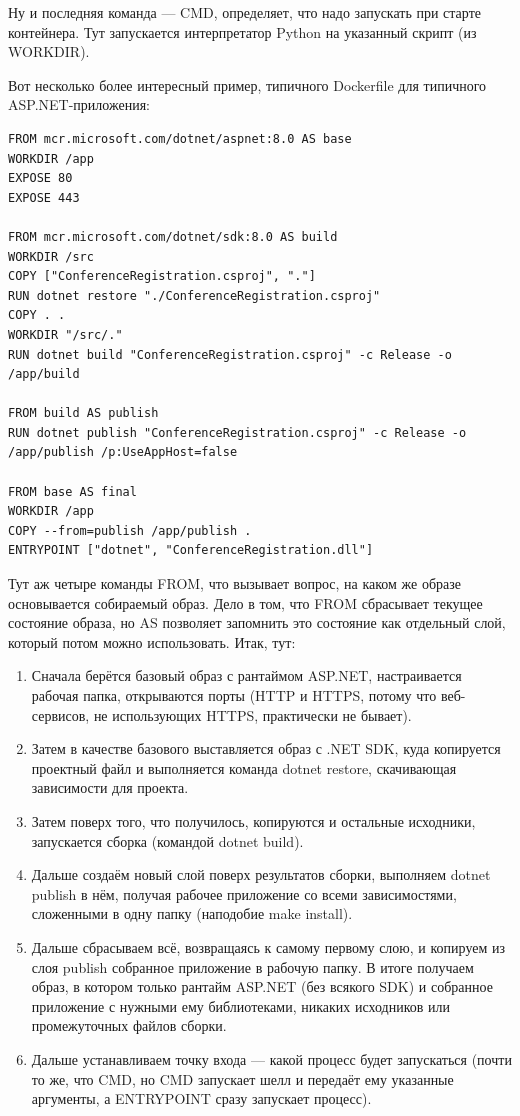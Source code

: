 \documentclass{../../text-style}
\begin{document}
Ну и последняя команда --- CMD, определяет, что надо запускать при старте контейнера. Тут запускается интерпретатор Python на указанный скрипт (из WORKDIR).

Вот несколько более интересный пример, типичного Dockerfile для типичного ASP.NET-приложения:

\begin{verbatim}
FROM mcr.microsoft.com/dotnet/aspnet:8.0 AS base
WORKDIR /app
EXPOSE 80
EXPOSE 443

FROM mcr.microsoft.com/dotnet/sdk:8.0 AS build
WORKDIR /src
COPY ["ConferenceRegistration.csproj", "."]
RUN dotnet restore "./ConferenceRegistration.csproj"
COPY . .
WORKDIR "/src/."
RUN dotnet build "ConferenceRegistration.csproj" -c Release -o /app/build

FROM build AS publish
RUN dotnet publish "ConferenceRegistration.csproj" -c Release -o /app/publish /p:UseAppHost=false

FROM base AS final
WORKDIR /app
COPY --from=publish /app/publish .
ENTRYPOINT ["dotnet", "ConferenceRegistration.dll"]
\end{verbatim}

Тут аж четыре команды FROM, что вызывает вопрос, на каком же образе основывается собираемый образ. Дело в том, что FROM сбрасывает текущее состояние образа, но AS позволяет запомнить это состояние как отдельный слой, который потом можно использовать. Итак, тут:

\begin{enumerate}
    \item Сначала берётся базовый образ с рантаймом ASP.NET, настраивается рабочая папка, открываются порты (HTTP и HTTPS, потому что веб-сервисов, не использующих HTTPS, практически не бывает).
    \item Затем в качестве базового выставляется образ с .NET SDK, куда копируется проектный файл и выполняется команда dotnet restore, скачивающая зависимости для проекта. 
    \item Затем поверх того, что получилось, копируются и остальные исходники, запускается сборка (командой dotnet build).
    \item Дальше создаём новый слой поверх результатов сборки, выполняем dotnet publish в нём, получая рабочее приложение со всеми зависимостями, сложенными в одну папку (наподобие make install).
    \item Дальше сбрасываем всё, возвращаясь к самому первому слою, и копируем из слоя publish собранное приложение в рабочую папку. В итоге получаем образ, в котором только рантайм ASP.NET (без всякого SDK) и собранное приложение с нужными ему библиотеками, никаких исходников или промежуточных файлов сборки.
    \item Дальше устанавливаем точку входа --- какой процесс будет запускаться (почти то же, что CMD, но CMD запускает шелл и передаёт ему указанные аргументы, а ENTRYPOINT сразу запускает процесс).
\end{enumerate}
\end{document}
